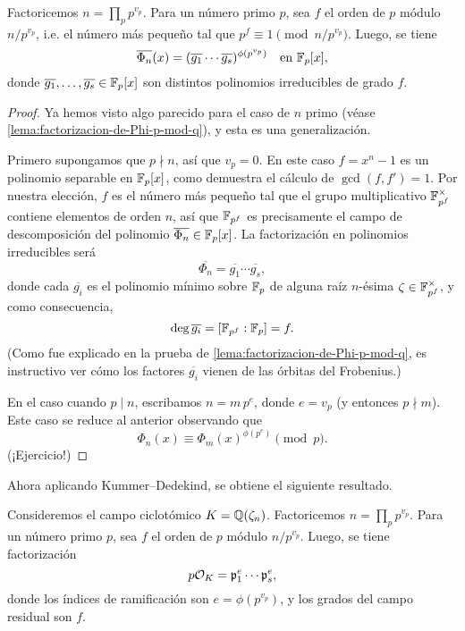 \begin{lema}
  Factoricemos $n = \prod_p p^{v_p}$. Para un número primo $p$, sea $f$
  el orden de $p$ módulo $n/p^{v_p}$, i.e. el número más pequeño tal que
  $p^f \equiv 1 \pmod{n/p^{v_p}}$.
  Luego, se tiene
  \[ \overline{\Phi_n} (x) = (\overline{g_1} \cdots \overline{g_s})^{\phi (p^{v_p})}
     \quad\text{en } \mathbb{F}_p [x], \]
  donde $\overline{g_1},\ldots,\overline{g_s} \in \mathbb{F}_p [x]$ son distintos
  polinomios irreducibles de grado $f$.

  \begin{proof}
    Ya hemos visto algo parecido para el caso de $n$ primo
    (véase \ref{lema:factorizacion-de-Phi-p-mod-q}), y esta es una
    generalización.

    Primero supongamos que $p \nmid n$, así que $v_p = 0$. En este caso
    $f = x^n - 1$ es un polinomio separable en $\mathbb{F}_p [x]$, como demuestra
    el cálculo de $\gcd (f,f') = 1$. Por nuestra elección, $f$ es el número
    más pequeño tal que el grupo multiplicativo $\mathbb{F}_{p^f}^\times$ contiene
    elementos de orden $n$, así que $\mathbb{F}_{p^f}$ es precisamente el campo de
    descomposición del polinomio $\overline{\Phi_n} \in \mathbb{F}_p [x]$.
    La factorización en polinomios irreducibles será
    $$\overline{\Phi_n} = \overline{g_1} \cdots \overline{g_s},$$
    donde cada $\overline{g_i}$ es el polinomio mínimo sobre $\mathbb{F}_p$ de alguna
    raíz $n$-ésima $\zeta \in \mathbb{F}_{p^f}^\times$, y como consecuencia,
    $$\deg \overline{g_i} = [\mathbb{F}_{p^f} : \mathbb{F}_p] = f.$$
    (Como fue explicado en la prueba de \ref{lema:factorizacion-de-Phi-p-mod-q},
    es instructivo ver cómo los factores $\overline{g_i}$ vienen de las órbitas
    del Frobenius.)

    En el caso cuando $p \mid n$, escribamos $n = m\,p^e$, donde $e = v_p$
    (y entonces $p \nmid m$). Este caso se reduce al anterior observando
    que
    $$\Phi_n (x) \equiv \Phi_m (x)^{\phi (p^e)} \pmod{p}.$$
    (¡Ejercicio!)
  \end{proof}
\end{lema}

Ahora aplicando Kummer--Dedekind, se obtiene el siguiente resultado.

\begin{teorema}
  Consideremos el campo ciclotómico $K = \mathbb{Q} (\zeta_n)$. Factoricemos
  $n = \prod_p p^{v_p}$. Para un número primo $p$, sea $f$ el orden
  de $p$ módulo $n/p^{v_p}$. Luego, se tiene factorización
  $$p \mathcal{O}_K = \mathfrak{p}_1^e \cdots \mathfrak{p}_s^e,$$
  donde los índices de ramificación son $e = \phi (p^{v_p})$,
  y los grados del campo residual son $f$.
\end{teorema}

